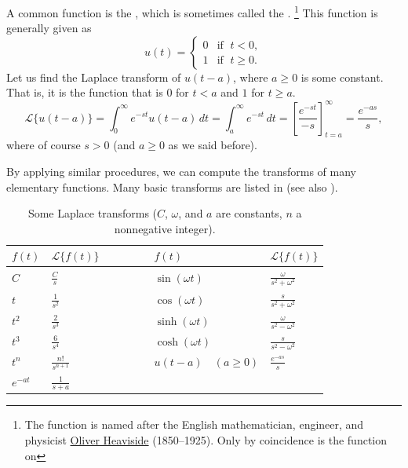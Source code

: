 \begin{example}
A common function is the \emph{}, which is
sometimes called the \emph{}.%
\footnote{The function is named after the English mathematician, engineer, and
physicist
\href{https://en.wikipedia.org/wiki/Heaviside}{Oliver Heaviside}
(1850--1925).  Only
by coincidence is the function  on }
This function is generally given as
\begin{equation*}
u(t) = 
\begin{cases}
0 & \text{if } \; t < 0 , \\
1 & \text{if } \; t \geq 0 .
\end{cases}
\end{equation*}
Let us find the Laplace transform of $u(t-a)$, where $a \geq 0$
is some constant.
That is, it is the function that is $0$ for $t < a$ and $1$ for $t \geq a$.
\begin{equation*}
\mathcal{L} \bigl\{ u(t-a) \bigr\}
=
\int_0^{\infty} e^{-st} u(t-a) \, dt
=
\int_a^{\infty} e^{-st} \, dt
=
\left[ \frac{e^{-st}}{-s} \right]_{t=a}^\infty
=
\frac{e^{-as}}{s} ,
\end{equation*}
where of course $s > 0$ (and $a \geq 0$ as we said before).
\end{example}

By applying similar procedures, we can compute the transforms of many
elementary functions.  Many basic transforms are listed in
 (see also ).

\begin{table}[h!t]
\mybeginframe
\capstart
\begin{center}
\begin{tabular}{@{}lllll@{}}
\toprule
$f(t)$ & $\mathcal{L} \bigl\{ f(t) \bigr\}$ & $\qquad\quad$ &
$f(t)$ & $\mathcal{L} \bigl\{ f(t) \bigr\}$ \\
\midrule
$C$ & $\frac{C}{s}$
& &
$\sin (\omega t)$ & $\frac{\omega}{s^2+\omega^2}$
\\[4pt]
$t$ & $\frac{1}{s^2}$
& &
$\cos (\omega t)$ & $\frac{s}{s^2+\omega^2}$
\\[4pt]
$t^2$ & $\frac{2}{s^3}$
& &
$\sinh (\omega t)$ & $\frac{\omega}{s^2-\omega^2}$
\\[4pt]
$t^3$ & $\frac{6}{s^4}$
& &
$\cosh (\omega t)$ & $\frac{s}{s^2-\omega^2}$
\\[4pt]
$t^n$ & $\frac{n!}{s^{n+1}}$
& &
$u(t-a) \quad (a \geq 0)$ & $\frac{e^{-as}}{s}$
\\[4pt]
$e^{-at}$ & $\frac{1}{s+a}$
& & &
\\[4pt]
\bottomrule
\end{tabular}
\end{center}
\caption{Some Laplace transforms ($C$, $\omega$, and $a$ are
constants, $n$ a nonnegative integer).\label{lt:table}}
\myendframe
\end{table}


